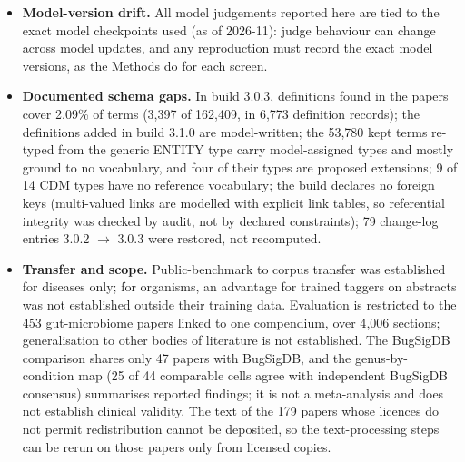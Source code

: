 \documentclass[referee,lineno,pdflatex,sn-vancouver-num]{sn-jnl}
\theoremstyle{thmstyleone}%
\theoremstyle{thmstyletwo}%
\theoremstyle{thmstylethree}%
\begin{document}
\begin{itemize}
always judged fair and so carry little information, and the triple screens (two judge models, two rubrics) are not
sanity-checked to the same depth for every judge; concordance with
model judges is not concordance with experts. The judges' majority rejects
68.9\% of stated DNA extraction methods, 56.3\% of sequencing platforms,
40.4\% of body sites and 40.2\% of intervention agents, so these catalogue
fields should be treated as low confidence. Each model step was run once
at temperature 0, and run-to-run variance was not measured.
\item \textbf{Model-version drift.} All model judgements reported here
are tied to the exact model checkpoints used (as of 2026-11): judge
behaviour can change across model updates, and any reproduction must
record the exact model versions, as the Methods do for each screen.
\item \textbf{Documented schema gaps.} In build 3.0.3, definitions found in
the papers cover 2.09\% of terms (3{,}397 of 162{,}409, in 6{,}773 definition
records); the definitions added in build 3.1.0 are model-written; the 53{,}780 kept terms re-typed from the
generic ENTITY type carry model-assigned types and mostly ground to no
vocabulary, and four of their types are proposed extensions; 9 of
14 CDM types have no reference vocabulary; the build declares no
foreign keys (multi-valued links are modelled with explicit link
tables, so referential integrity was checked by audit, not by
declared constraints); 79 change-log entries 3.0.2 $\to$ 3.0.3 were
restored, not recomputed.
\item \textbf{Transfer and scope.} Public-benchmark to corpus
transfer was established for diseases only; for organisms, an
advantage for trained taggers on abstracts was not established
outside their training data. Evaluation is restricted to the 453
gut-microbiome papers linked to one compendium, over 4{,}006
sections; generalisation to other bodies of literature is not
established. The BugSigDB comparison shares only 47 papers with
BugSigDB, and the genus-by-condition map (25 of 44 comparable cells
agree with independent BugSigDB consensus) summarises reported findings;
it is not a meta-analysis and does not establish clinical validity. The
text of the 179 papers whose licences do not permit redistribution cannot
be deposited, so the text-processing steps can be rerun on those papers
only from licensed copies.
\end{itemize}
\end{document}
